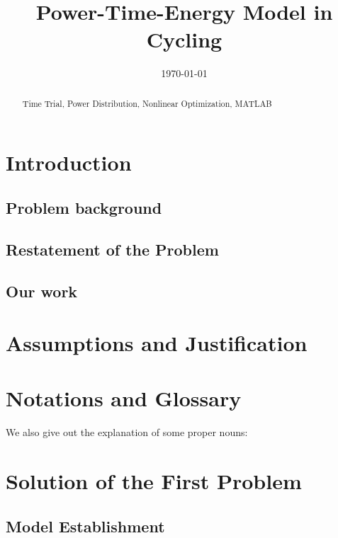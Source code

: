 \documentclass{mcmthesis}
\title{Power-Time-Energy Model in Cycling}
\date{\today}
\begin{document}
\begin{abstract}

\begin{keywords}
Time Trial, Power Distribution, Nonlinear Optimization,  MATLAB
\end{keywords}

\end{abstract}

\maketitle

\tableofcontents   %

\newpage


\section{Introduction}

\subsection{Problem background}


\subsection{Restatement of the Problem}


\subsection{Our work}

\section{Assumptions and Justification}

\section{Notations and Glossary}

\par We also give out the explanation of some proper nouns:


\section{Solution of the First Problem}

\subsection{Model Establishment}

\end{document}

